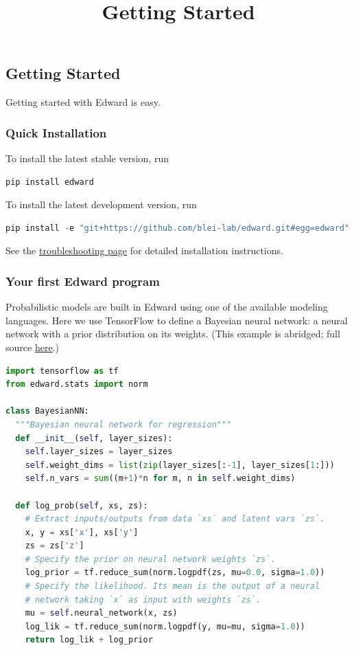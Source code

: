 \title{Getting Started}

\subsection{Getting Started}
Getting started with Edward is easy.

\subsubsection{Quick Installation}
To install the latest stable version, run

\begin{lstlisting}[language=Java]
pip install edward
\end{lstlisting}

To install the latest development version, run

\begin{lstlisting}[language=Java]
pip install -e "git+https://github.com/blei-lab/edward.git#egg=edward"
\end{lstlisting}

See the \href{troubleshooting}{troubleshooting page} for detailed
installation instructions.


\subsubsection{Your first Edward program}

Probabilistic models are built in Edward using one of the available
modeling languages. Here we use TensorFlow to define a Bayesian neural
network: a neural network with a prior distribution on its weights.
(This example is abridged; full source
\href{https://github.com/blei-lab/edward/blob/master/examples/getting_started_example.py}
{here}.)
\begin{lstlisting}[language=Python]
import tensorflow as tf
from edward.stats import norm

class BayesianNN:
  """Bayesian neural network for regression"""
  def __init__(self, layer_sizes):
    self.layer_sizes = layer_sizes
    self.weight_dims = list(zip(layer_sizes[:-1], layer_sizes[1:]))
    self.n_vars = sum((m+1)*n for m, n in self.weight_dims)

  def log_prob(self, xs, zs):
    # Extract inputs/outputs from data `xs` and latent vars `zs`.
    x, y = xs['x'], xs['y']
    zs = zs['z']
    # Specify the prior on neural network weights `zs`.
    log_prior = tf.reduce_sum(norm.logpdf(zs, mu=0.0, sigma=1.0))
    # Specify the likelihood. Its mean is the output of a neural
    # network taking `x` as input with weights `zs`.
    mu = self.neural_network(x, zs)
    log_lik = tf.reduce_sum(norm.logpdf(y, mu=mu, sigma=1.0))
    return log_lik + log_prior
\end{lstlisting}

